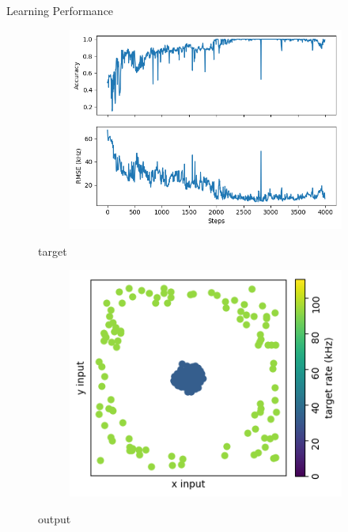 \documentclass[12pt, aspectratio=169]{beamer}
\begin{document}
\begin{frame}{Learning Performance}
\begin{figure}[!htb]
        \begin{figure}
            \includegraphics[scale=0.6]{learning_process/learning_performance.png}
        \end{figure}
  	\endminipage\hfill
  	\centering
        target
        \begin{figure}
            \includegraphics[scale=0.25]{targets.png}
            \label{fig:my_label}
        \end{figure}
        output
        \begin{figure}

\end{figure}
\end{figure}
\end{frame}
\end{document}
